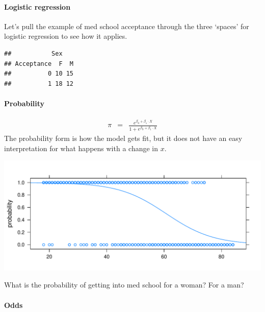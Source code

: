 \documentclass[10pt]{article}\usepackage[]{graphicx}\usepackage[]{color}
\makeatletter
\def\maxwidth{ %
  \ifdim\Gin@nat@width>\linewidth
    \linewidth
  \else
    \Gin@nat@width
  \fi
}
\newenvironment{kframe}{%
 \def\at@end@of@kframe{}%
 \ifinner\ifhmode%
  \def\at@end@of@kframe{\end{minipage}}%
  \begin{minipage}{\columnwidth}%
 \fi\fi%
 \def\FrameCommand##1{\hskip\@totalleftmargin \hskip-\fboxsep
 \colorbox{shadecolor}{##1}\hskip-\fboxsep
     \hskip-\linewidth \hskip-\@totalleftmargin \hskip\columnwidth}%
 \MakeFramed {\advance\hsize-\width
   \@totalleftmargin\z@ \linewidth\hsize
   \@setminipage}}%
 {\par\unskip\endMakeFramed%
 \at@end@of@kframe}
\newenvironment{knitrout}{}{} %
\makeatother
\begin{document}
\paragraph{Logistic regression}
Let's pull the example of med school acceptance through the three `spaces' for logistic regression to see how it applies.



\begin{knitrout}\footnotesize
{}\color{fgcolor}\begin{kframe}
\begin{verbatim}
##           Sex
## Acceptance  F  M
##          0 10 15
##          1 18 12
\end{verbatim}
\end{kframe}
\end{knitrout}


\paragraph{Probability}
	\begin{eqnarray*}
			\pi &=& \frac{e^{\beta_0 + \beta_1\cdot X}}{1 + e^{\beta_0 + \beta_1\cdot X}}
		\end{eqnarray*}
		The probability form is how the model gets fit, but it does not have an easy interpretation for what happens with a change in $x$. 
		
\begin{knitrout}\footnotesize
{}\color{fgcolor}
\includegraphics[width=\maxwidth]{figure/unnamed-chunk-4-1} 

\end{knitrout}

What is the probability of getting into med school for a woman? For a man? 
\vspace{0.5in}
\paragraph{Odds}
		
\end{document}

